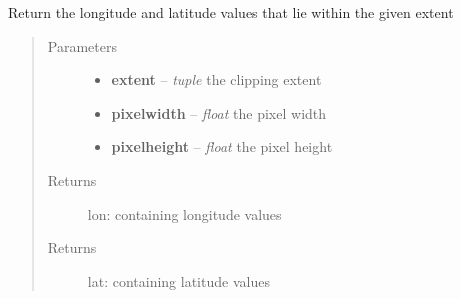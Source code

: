 \documentclass[letterpaper,10pt,english]{sphinxmanual}
\begin{document}
\begin{fulllineitems}
\label{docs/utilities:nctools.get_lat_lon}
Return the longitude and latitude values that lie within
the given extent
\begin{quote}\begin{description}
\item[{Parameters}] \leavevmode\begin{itemize}
\item {} 
\textbf{extent} -- \emph{tuple} the clipping extent

\item {} 
\textbf{pixelwidth} -- \emph{float} the pixel width

\item {} 
\textbf{pixelheight} -- \emph{float} the pixel height

\end{itemize}

\item[{Returns}] \leavevmode
lon:  containing longitude values

\item[{Returns}] \leavevmode
lat:  containing latitude values

\end{description}\end{quote}

\end{fulllineitems}


\end{document}

